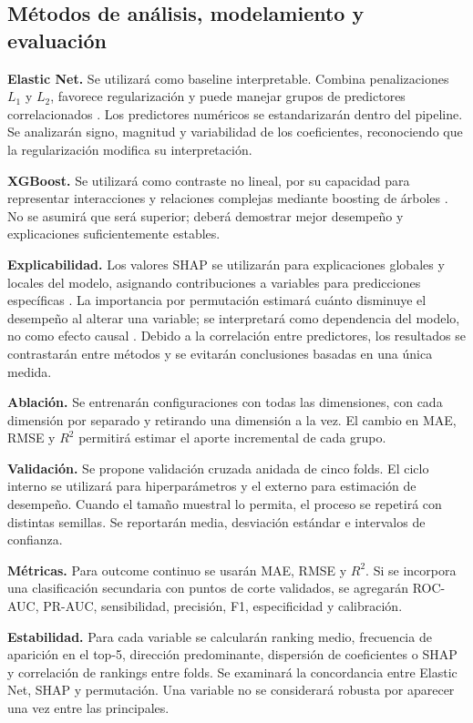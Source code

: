 \documentclass[11pt,a4paper]{article}
\begin{document}
\subsection{Métodos de análisis, modelamiento y evaluación}

\textbf{Elastic Net.} Se utilizará como baseline interpretable. Combina penalizaciones $L_1$ y $L_2$, favorece regularización y puede manejar grupos de predictores correlacionados \cite{zou2005}. Los predictores numéricos se estandarizarán dentro del pipeline. Se analizarán signo, magnitud y variabilidad de los coeficientes, reconociendo que la regularización modifica su interpretación.

\textbf{XGBoost.} Se utilizará como contraste no lineal, por su capacidad para representar interacciones y relaciones complejas mediante boosting de árboles \cite{chen2016}. No se asumirá que será superior; deberá demostrar mejor desempeño y explicaciones suficientemente estables.

\textbf{Explicabilidad.} Los valores SHAP se utilizarán para explicaciones globales y locales del modelo, asignando contribuciones a variables para predicciones específicas \cite{lundberg2017}. La importancia por permutación estimará cuánto disminuye el desempeño al alterar una variable; se interpretará como dependencia del modelo, no como efecto causal \cite{fisher2019}. Debido a la correlación entre predictores, los resultados se contrastarán entre métodos y se evitarán conclusiones basadas en una única medida.

\textbf{Ablación.} Se entrenarán configuraciones con todas las dimensiones, con cada dimensión por separado y retirando una dimensión a la vez. El cambio en MAE, RMSE y $R^2$ permitirá estimar el aporte incremental de cada grupo.

\textbf{Validación.} Se propone validación cruzada anidada de cinco folds. El ciclo interno se utilizará para hiperparámetros y el externo para estimación de desempeño. Cuando el tamaño muestral lo permita, el proceso se repetirá con distintas semillas. Se reportarán media, desviación estándar e intervalos de confianza.

\textbf{Métricas.} Para outcome continuo se usarán MAE, RMSE y $R^2$. Si se incorpora una clasificación secundaria con puntos de corte validados, se agregarán ROC-AUC, PR-AUC, sensibilidad, precisión, F1, especificidad y calibración.

\textbf{Estabilidad.} Para cada variable se calcularán ranking medio, frecuencia de aparición en el top-5, dirección predominante, dispersión de coeficientes o SHAP y correlación de rankings entre folds. Se examinará la concordancia entre Elastic Net, SHAP y permutación. Una variable no se considerará robusta por aparecer una vez entre las principales.
\end{document}
